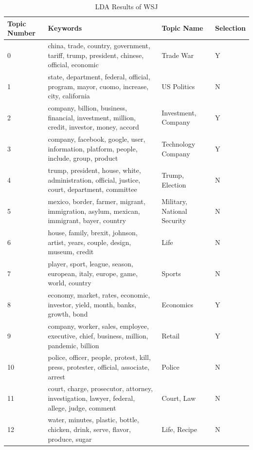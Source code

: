 \documentclass[a4paper, 12pt]{report}
\begin{document}
\begin{longtable}{p{1.5cm}p{7cm}p{3cm}p{1.5cm}}
\caption{LDA Results of WSJ}
\hline
Topic Number & Keywords & Topic Name & Selection \\
\hline
0 & \multicolumn{1}{m{6cm}}{china, trade, country, government, tariff, trump, president, chinese, official, economic} & Trade War & Y \\
\hline
1 & \multicolumn{1}{m{6cm}}{state, department, federal, official, program, mayor, cuomo, increase, city, california} & US Politics & N \\
\hline
2 & \multicolumn{1}{m{6cm}}{company, billion, business, financial, investment, million, credit, investor, money, accord} & Investment, Company & Y \\
\hline
3 & \multicolumn{1}{m{6cm}}{company, facebook, google, user, information, platform, people, include, group, product} & Technology Company & Y \\
\hline
4 & \multicolumn{1}{m{6cm}}{trump, president, house, white, administration, official, justice, court, department, committee} & Trump, Election & N \\
\hline
5 & \multicolumn{1}{m{6cm}}{mexico, border, farmer, migrant, immigration, asylum, mexican, immigrant, bayer, country} & Military, National Security & N \\ 
\hline
6 & \multicolumn{1}{m{6cm}}{house, family, brexit, johnson, artist, years, couple, design, museum, credit} & Life & N \\ 
\hline
7 & \multicolumn{1}{m{6cm}}{player, sport, league, season, european, italy, europe, game, world, country} & Sports & N \\ 
\hline
8 & \multicolumn{1}{m{6cm}}{economy, market, rates, economic, investor, yield, month, banks, growth, bond} & Economics & Y \\ 
\hline
9 & \multicolumn{1}{m{6cm}}{company, worker, sales, employee, executive, chief, business, million, pandemic, billion} & Retail & Y \\   
\hline
10 & \multicolumn{1}{m{6cm}}{police, officer, people, protest, kill, press, protester, official, associate, arrest} & Police & N \\    
\hline
11 & \multicolumn{1}{m{6cm}}{court, charge, prosecutor, attorney, investigation, lawyer, federal, allege, judge, comment} & Court, Law & N \\     
\hline
12 & \multicolumn{1}{m{6cm}}{water, minutes, plastic, bottle, chicken, drink, serve, flavor, produce, sugar} & Life, Recipe & N \\   

\end{longtable}
\end{document}
